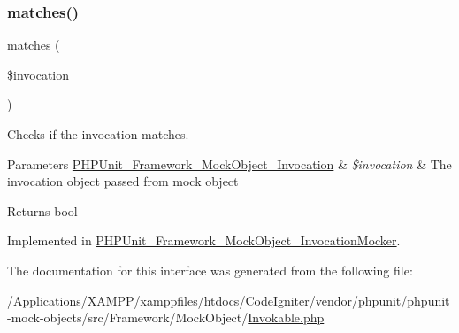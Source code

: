 \mbox{\label{interface_p_h_p_unit___framework___mock_object___invokable_a4988c6fa11e275302172d0a4ae32dd3a}} 
\subsubsection{\texorpdfstring{matches()}{matches()}}
{\footnotesize\ttfamily matches (\begin{DoxyParamCaption}\item[{\mbox{\hyperlink{interface_p_h_p_unit___framework___mock_object___invocation}{P\+H\+P\+Unit\+\_\+\+Framework\+\_\+\+Mock\+Object\+\_\+\+Invocation}}}]{\$invocation }\end{DoxyParamCaption})}

Checks if the invocation matches.


\begin{DoxyParams}[1]{Parameters}
\mbox{\hyperlink{interface_p_h_p_unit___framework___mock_object___invocation}{P\+H\+P\+Unit\+\_\+\+Framework\+\_\+\+Mock\+Object\+\_\+\+Invocation}} & {\em \$invocation} & The invocation object passed from mock object\\
\hline
\end{DoxyParams}
\begin{DoxyReturn}{Returns}
bool 
\end{DoxyReturn}


Implemented in \mbox{\hyperlink{class_p_h_p_unit___framework___mock_object___invocation_mocker_a4988c6fa11e275302172d0a4ae32dd3a}{P\+H\+P\+Unit\+\_\+\+Framework\+\_\+\+Mock\+Object\+\_\+\+Invocation\+Mocker}}.



The documentation for this interface was generated from the following file\+:\begin{DoxyCompactItemize}
\item 
/\+Applications/\+X\+A\+M\+P\+P/xamppfiles/htdocs/\+Code\+Igniter/vendor/phpunit/phpunit-\/mock-\/objects/src/\+Framework/\+Mock\+Object/\mbox{\hyperlink{_invokable_8php}{Invokable.\+php}}\end{DoxyCompactItemize}
